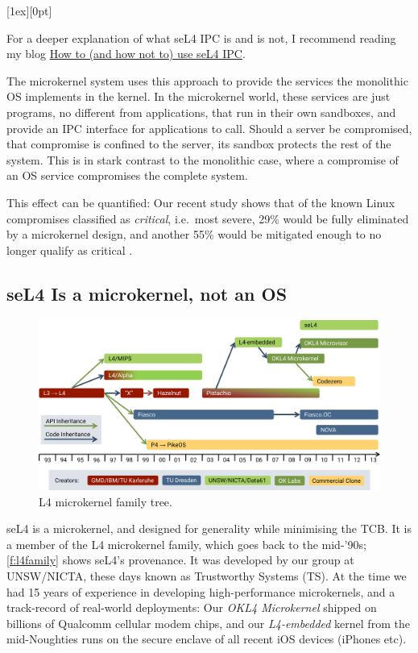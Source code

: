 \documentclass[english,a4paper,12pt\ifDraft,draft\fi]{report}
\newcommand{\SSect}[1]{\subsection{#1}}
\newcommand{\SSect}[1]{\section{#1}}
\newlength{\chillilng}\setlength{\chillilng}{8mm}
\newlength{\chillimarg}\setlength{\chillimarg}{10mm}
\newcommand{\chilli}{\texttt{[image: chilli]}}
\newcommand{\chilliItem}{\raisebox{-5mm}[1ex][0pt]{%
      \makebox[\chillilng][r]{\chilli}}}
\newenvironment{Chilli}{
    \begin{list}{}{
      \setlength{\labelwidth}{\chillilng}
      \setlength{\leftmargin}{\chillimarg}}
    \item[\chilliItem]
    }
  {\end{list}}
\begin{document}
  \begin{Chilli}
    For a deeper explanation of what seL4 IPC is and is not, I
    recommend reading my blog \href{https://microkerneldude.wordpress.com/2019/03/07/how-to-and-how-not-to-use-sel4-ipc/}{How to (and how not to) use seL4 IPC}.
  \end{Chilli}

  The microkernel system uses this approach to provide the services
  the monolithic OS implements in the kernel. In the microkernel
  world, these services are just programs, no different from applications,
  that run in their own sandboxes, and provide an IPC interface for
  applications to call. Should a server be compromised, that compromise is
  confined to the server, its sandbox protects the rest of the
  system. This is in stark contrast to the monolithic case, where a
  compromise of an OS service compromises the complete system.

  This effect can be quantified: Our recent study shows that of the
  known Linux compromises classified as \emph{critical}, i.e.\ most
  severe, 29\% would be fully eliminated by a microkernel design, and
  another 55\% would be mitigated enough to no longer qualify as
  critical \citep{Biggs_LH_18}.

  \SSect{seL4 Is a microkernel, not an OS}


  \begin{figure}[ht]
    \centering
    \includegraphics{l4family}
    \caption{L4 microkernel family tree.}
    \label{f:l4family}
  \end{figure}

  seL4 is a microkernel, and designed for generality while
  minimising the TCB. It is a member of the L4
  microkernel family, which goes back to the mid-'90s;
  \autoref{f:l4family} shows seL4's provenance. It was developed by our group at UNSW/NICTA,
  these days known as Trustworthy Systems (TS). At the time we
  had 15 years of experience in developing
  high-performance microkernels, and a track-record of
  real-world deployments: Our \emph{OKL4 Microkernel} shipped on
  billions of Qualcomm cellular modem chips, and our \emph{L4-embedded} kernel from the
  mid-Noughties runs on the secure enclave of all recent
  iOS devices (iPhones etc).
\end{document}
